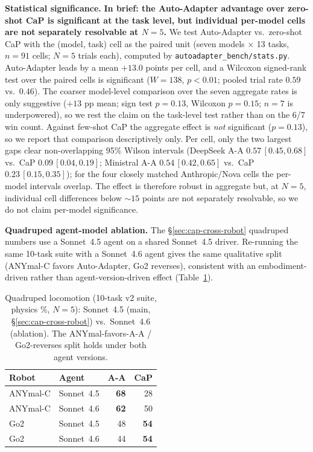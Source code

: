 \noindent\textbf{Statistical significance.} \textbf{In brief: the
Auto-Adapter advantage over zero-shot CaP is significant at the
task level, but individual per-model cells are not separately
resolvable at $N{=}5$.} We test Auto-Adapter vs.\
zero-shot CaP with the (model, task) cell as the paired unit (seven
models $\times$ 13 tasks, $n{=}91$ cells; $N{=}5$ trials each), computed
by \texttt{autoadapter\_bench/stats.py}. Auto-Adapter leads by a mean
$+13.0$ points per cell, and a Wilcoxon signed-rank test over the paired
cells is significant ($W{=}138$, $p{<}0.01$; pooled trial rate $0.59$
vs.\ $0.46$). The coarser model-level comparison over the seven
aggregate rates is only suggestive ($+13$ pp mean; sign test $p{=}0.13$,
Wilcoxon $p{=}0.15$; $n{=}7$ is underpowered), so we rest the claim on
the task-level test rather than on the 6/7 win count. Against few-shot
CaP the aggregate effect is \emph{not} significant ($p{=}0.13$), so we
report that comparison descriptively only. Per cell, only the two
largest gaps clear non-overlapping 95\% Wilson intervals (DeepSeek A-A
$0.57\,[0.45,0.68]$ vs.\ CaP $0.09\,[0.04,0.19]$; Ministral A-A
$0.54\,[0.42,0.65]$ vs.\ CaP $0.23\,[0.15,0.35]$); for the four closely matched Anthropic/Nova cells the per-model
intervals overlap. The effect is therefore robust in aggregate but, at
$N{=}5$, individual cell differences below ${\sim}15$ points are not
separately resolvable, so we do not claim per-model significance.

\noindent\textbf{Quadruped agent-model ablation.} The
\S\ref{sec:cap-cross-robot} quadruped numbers use a Sonnet~4.5 agent
on a shared Sonnet~4.5 driver. Re-running the same 10-task suite with
a Sonnet~4.6 agent gives the same qualitative split (ANYmal-C
favors Auto-Adapter, Go2 reverses), consistent with an
embodiment-driven rather than agent-version-driven effect
(Table~\ref{tab:quad-ablation}).

\begin{table}[H]
\centering
\small
\begin{tabular}{llrr}
\toprule
\textbf{Robot} & \textbf{Agent} & \textbf{A-A} & \textbf{CaP} \\
\midrule
ANYmal-C & Sonnet~4.5 & \textbf{68} & 28 \\
ANYmal-C & Sonnet~4.6 & \textbf{62} & 50 \\
Go2      & Sonnet~4.5 & 48 & \textbf{54} \\
Go2      & Sonnet~4.6 & 44 & \textbf{54} \\
\bottomrule
\end{tabular}
\caption{Quadruped locomotion (10-task v2 suite, physics \%, $N{=}5$):
Sonnet~4.5 (main, \S\ref{sec:cap-cross-robot}) vs.\ Sonnet~4.6
(ablation). The ANYmal-favors-A-A / Go2-reverses split holds under
both agent versions.}
\label{tab:quad-ablation}
\end{table}

